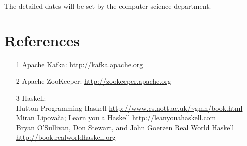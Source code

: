 The detailed dates will be set by the computer science department.

\section*{References}
\begin{itemize}
    \item [1] Apache Kafka: \url{http://kafka.apache.org}
    \item [2] Apache ZooKeeper: \url{http://zookeeper.apache.org}
    \item [3] Haskell: \\
           Hutton Programming Haskell
           \url{http://www.cs.nott.ac.uk/~gmh/book.html}\\
            Miran Lipovača; Learn you a Haskell
            \url{http://leanyouahaskell.com} \\
            Bryan O'Sullivan, Don Stewart, and John Goerzen  Real World Haskell 
            \url{http://book.realworldhaskell.org}
\end{itemize}

